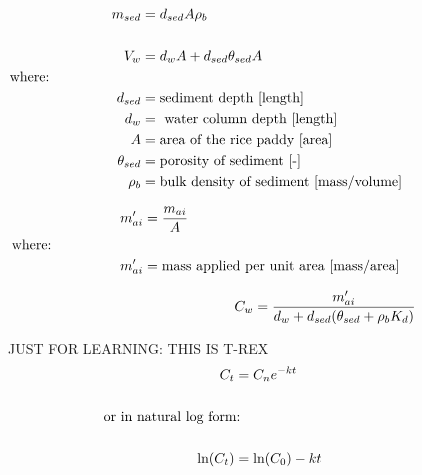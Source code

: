 \documentclass[12pt, A4]{article}
\begin{document}
\begin{align}
m_{sed} & = d_{sed} A \rho_b    \\ \nonumber \\
V_w & = d_w A + d_{sed} \theta_{sed}  A    \\ 
 &    \hspace{-1.3in}  \text{where:} \nonumber \\
d_{sed} & = \text{sediment depth [length]}  \nonumber \\
d_w & = \text{ water column depth [length]} \nonumber \\
A & = \text{area of the rice paddy [area]} \nonumber \\
\theta_{sed} & = \text{porosity of sediment [-]} \nonumber \\
\rho_b & = \text{bulk density of sediment [mass/volume] }\nonumber 
\end{align}

\begin{align}
m_{ai}^\prime  & =  \frac{m_{ai}}{A}    \\
 &    \hspace{-1.3in}  \text{where:} \nonumber \\
m_{ai}^\prime & = \text{mass applied per unit area [mass/area]} \nonumber
\end{align}

\begin{align}
 \hspace{1.3in} C_w =     \frac{m_{ai}^\prime}{d_w + d_{sed}  ( \theta_{sed}+ \rho_b K_d  )} 
\end{align}


JUST FOR LEARNING:  THIS IS T-REX
\begin{align}
C_t & = C_n e^{-kt} \\ \nonumber  \\
&    \hspace{-1.3in} \text{or in natural log form:} \nonumber \\ \nonumber \\
\text{ln}(C_t) & = \text{ln}(C_0) - kt
\end{align}
\end{document}
